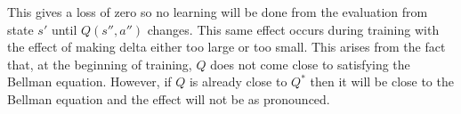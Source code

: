 \documentclass[%
 reprint,
nofootinbib,
 amsmath,amssymb,
 aps,
]{revtex4-1}
\begin{document}
This gives a loss of zero so no learning will be done from the evaluation from state $s'$ until $Q(s'',a'')$ changes. This same effect occurs during training with the effect of making delta either too large or too small. This arises from the fact that, at the beginning of training, $Q$ does not come close to satisfying the Bellman equation. However, if $Q$ is already close to $Q^*$ then it will be close to the Bellman equation and the effect will not be as pronounced.

\end{document}
